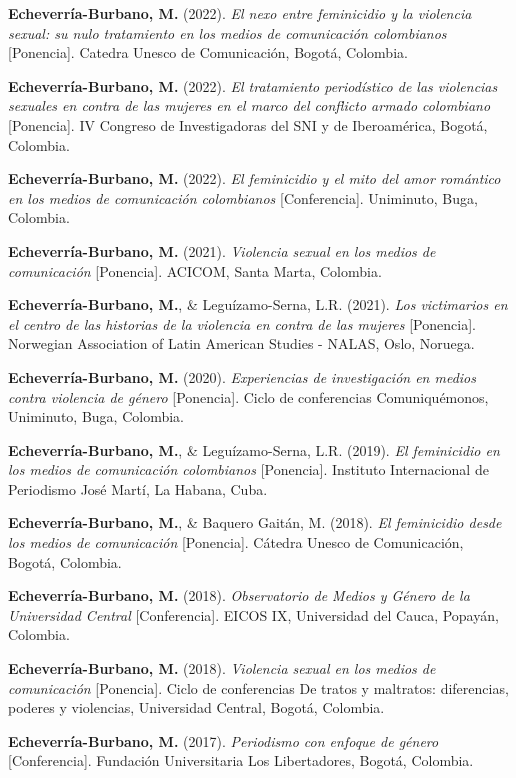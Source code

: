 \documentclass[11pt,a4paper,]{awesome-cv}
\begin{document}
\textbf{Echeverría-Burbano, M.} (2022). \emph{El nexo entre feminicidio
y la violencia sexual: su nulo tratamiento en los medios de comunicación
colombianos} {[}Ponencia{]}. Catedra Unesco de Comunicación, Bogotá,
Colombia.

\textbf{Echeverría-Burbano, M.} (2022). \emph{El tratamiento
periodístico de las violencias sexuales en contra de las mujeres en el
marco del conflicto armado colombiano} {[}Ponencia{]}. IV Congreso de
Investigadoras del SNI y de Iberoamérica, Bogotá, Colombia.

\textbf{Echeverría-Burbano, M.} (2022). \emph{El feminicidio y el mito
del amor romántico en los medios de comunicación colombianos}
{[}Conferencia{]}. Uniminuto, Buga, Colombia.

\textbf{Echeverría-Burbano, M.} (2021). \emph{Violencia sexual en los
medios de comunicación} {[}Ponencia{]}. ACICOM, Santa Marta, Colombia.

\textbf{Echeverría-Burbano, M.}, \& Leguízamo-Serna, L.R. (2021).
\emph{Los victimarios en el centro de las historias de la violencia en
contra de las mujeres} {[}Ponencia{]}. Norwegian Association of Latin
American Studies - NALAS, Oslo, Noruega.

\textbf{Echeverría-Burbano, M.} (2020). \emph{Experiencias de
investigación en medios contra violencia de género} {[}Ponencia{]}.
Ciclo de conferencias Comuniquémonos, Uniminuto, Buga, Colombia.

\textbf{Echeverría-Burbano, M.}, \& Leguízamo-Serna, L.R. (2019).
\emph{El feminicidio en los medios de comunicación colombianos}
{[}Ponencia{]}. Instituto Internacional de Periodismo José Martí, La
Habana, Cuba.

\textbf{Echeverría-Burbano, M.}, \& Baquero Gaitán, M. (2018). \emph{El
feminicidio desde los medios de comunicación} {[}Ponencia{]}. Cátedra
Unesco de Comunicación, Bogotá, Colombia.

\textbf{Echeverría-Burbano, M.} (2018). \emph{Observatorio de Medios y
Género de la Universidad Central} {[}Conferencia{]}. EICOS IX,
Universidad del Cauca, Popayán, Colombia.

\textbf{Echeverría-Burbano, M.} (2018). \emph{Violencia sexual en los
medios de comunicación} {[}Ponencia{]}. Ciclo de conferencias De tratos
y maltratos: diferencias, poderes y violencias, Universidad Central,
Bogotá, Colombia.

\textbf{Echeverría-Burbano, M.} (2017). \emph{Periodismo con enfoque de
género} {[}Conferencia{]}. Fundación Universitaria Los Libertadores,
Bogotá, Colombia.
\end{document}
